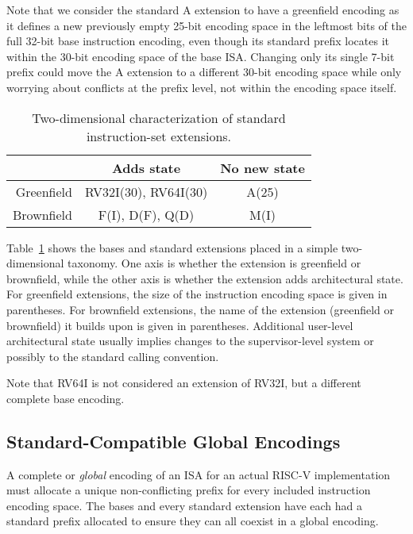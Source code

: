 Note that we consider the standard A extension to have a greenfield
encoding as it defines a new previously empty 25-bit encoding space in
the leftmost bits of the full 32-bit base instruction encoding, even
though its standard prefix locates it within the 30-bit encoding space
of the base ISA.  Changing only its single 7-bit prefix could move the
A extension to a different 30-bit encoding space while only worrying
about conflicts at the prefix level, not within the encoding space
itself.

\begin{table}[H]
{
\begin{center}
\begin{tabular}{|r|c|c|}
\hline
 & Adds state & No new state \\ \hline
Greenfield & RV32I(30), RV64I(30) & A(25) \\\hline
Brownfield & F(I), D(F), Q(D) & M(I) \\
\hline
\end{tabular}
\end{center}
}
\caption{Two-dimensional characterization of standard instruction-set
  extensions.}
\label{exttax}
\end{table}

Table~\ref{exttax} shows the bases and standard extensions placed in a
simple two-dimensional taxonomy.  One axis is whether the extension is
greenfield or brownfield, while the other axis is whether the
extension adds architectural state.  For greenfield extensions, the
size of the instruction encoding space is given in parentheses.  For
brownfield extensions, the name of the extension (greenfield or
brownfield) it builds upon is given in parentheses.  Additional
user-level architectural state usually implies changes to the
supervisor-level system or possibly to the standard calling
convention.

Note that RV64I is not considered an extension of RV32I, but a
different complete base encoding.

\vspace{-0.2in}
\subsection*{Standard-Compatible Global Encodings}

A complete or {\em global} encoding of an ISA for an actual RISC-V
implementation must allocate a unique non-conflicting prefix for every
included instruction encoding space.  The bases and every standard
extension have each had a standard prefix allocated to ensure they can
all coexist in a global encoding.


